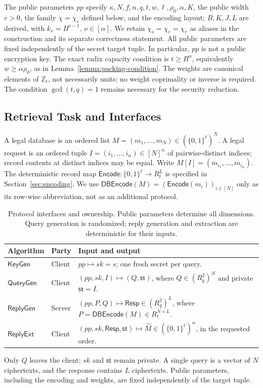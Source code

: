 The public parameters \(pp\) specify \(\kappa,N,f,n,q,t,w,\ell,\rho_0,\alpha,K\),
the public width \(r>0\), the family \(\chi=\chi_r\) defined below, and the
encoding layout; \(B,K,J,L\) are derived, with \(k_\nu=B^{\nu-1}\), \(\nu\in[\alpha]\). We retain
\(\chi_s=\chi_e=\chi_r\) as aliases in the construction and its separate
correctness statement. All public parameters are fixed independently
of the secret target tuple. In particular, \(pp\)
is not a public encryption key. The exact radix capacity condition is
\(t\ge B^\alpha\), equivalently \(w\ge\alpha\rho_0\), as in
Lemma~\ref{lemma:packing-condition}. The weights are canonical elements of
\(\mathbb Z_t\), not necessarily units; no weight coprimality or inverse
is required. The condition \(\gcd(t,q)=1\) remains necessary for the
security reduction. 

\subsection{Retrieval Task and Interfaces}
\label{sec:mq-model}
A legal database is an ordered list \(M=(m_1,\ldots,m_N)\in
(\{0,1\}^{\ell})^N\). A legal request is an ordered tuple
\(I=(i_1,\ldots,i_\alpha)\in[N]^\alpha\) of pairwise-distinct indices;
record contents at distinct indices may be equal. Write
\(M[I]=(m_{i_1},\ldots,m_{i_\alpha})\).
The deterministic record map \(\mathsf{Encode}:\{0,1\}^{\ell}\to R_t^L\)
is specified in Section~\ref{sec:encoding}. We use
\(\mathsf{DBEncode}(M)=(\mathsf{Encode}(m_i))_{i\in[N]}\)
only as its row-wise abbreviation, not as an additional protocol.

\begin{table}[t]
\centering\small
\caption{Protocol interfaces and ownership. Public parameters determine all
dimensions. Query generation is randomized; reply generation and extraction
are deterministic for their inputs.}
\label{tab:interfaces}
\begin{tabularx}{\linewidth}{@{}llX@{}}
\toprule Algorithm & Party & Input and output \\
\midrule
\(\mathsf{KeyGen}\) & Client & \(pp\mapsto sk=s\); one fresh secret per query. \\
\(\mathsf{QueryGen}\) & Client & \((pp,sk,I)\mapsto(Q,\mathsf{st})\), where
\(Q\in(R_q^2)^N\) and private \(\mathsf{st}=I\). \\
\(\mathsf{ReplyGen}\) & Server & \((pp,P,Q)\mapsto\mathsf{Resp}\in(R_q^2)^L\),
where \(P=\mathsf{DBEncode}(M)\in R_t^{N\times L}\). \\
\(\mathsf{ReplyExt}\) & Client & \((pp,sk,\mathsf{Resp},\mathsf{st})\mapsto
\widehat M\in(\{0,1\}^{\ell})^\alpha\), in the requested order. \\
\bottomrule
\end{tabularx}
\end{table}
Only \(Q\) leaves the client; \(sk\) and \(\mathsf{st}\) remain private.
A single query is a vector of \(N\) ciphertexts, and the response contains
\(L\) ciphertexts. Public parameters, including the encoding and weights,
are fixed independently of the target tuple.

